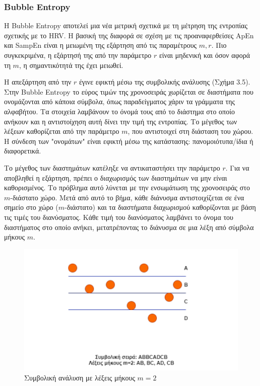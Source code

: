 \subsubsection{\en Bubble Entropy \gr}
Η \en Bubble Entropy \gr αποτελεί μια νέα μετρική σχετικά με τη μέτρηση της εντροπίας σχετικής με το \en HRV. \gr Η βασική της διαφορά σε σχέση με τις προαναφερθείσες \en ApEn \gr και \en SampEn \gr είναι η μειωμένη της εξάρτηση από τις παραμέτρους $m, r$. Πιο συγκεκριμένα, η εξάρτησή της από την παράμετρο $r$ είναι μηδενική και όσον αφορά τη $m$, η σημαντικότητά της έχει μειωθεί.
\par 
Η απεξάρτηση από την $r$ έγινε εφικτή μέσω της συμβολικής ανάλυσης (Σχήμα 3.5). Στην \en Bubble Entropy \gr το εύρος τιμών της χρονοσειράς χωρίζεται σε διαστήματα που ονομάζονται από κάποια σύμβολα, όπως παραδείγματος χάριν τα γράμματα της αλφαβήτου. Τα στοιχεία λαμβάνουν το όνομά τους από το διάστημα στο οποίο ανήκουν και η αντιστοίχηση αυτή δίνει την τιμή της εντροπίας. Το μέγεθος των λέξεων καθορίζεται από την παράμετρο $m$, που αντιστοιχεί στη διάσταση του χώρου. Η σύνδεση των "ονομάτων" είναι εφικτή μέσω της κατάστασης: πανομοιότυπα/ίδια ή διαφορετικά. 
\par
Το μέγεθος των διαστημάτων κατέληξε να αντικαταστήσει την παράμετρο $r$. Για να αποβληθεί η εξάρτηση, πρέπει ο διαχωρισμός των διαστημάτων να μην είναι καθορισμένος. Το πρόβλημα αυτό λύνεται με την ενσωμάτωση της χρονοσειράς στο $m$-διάστατο χώρο. Μετά από αυτό το βήμα, κάθε διάνυσμα αντιστοιχίζεται σε ένα σημείο στο χώρο ($m$-διάστατο) και τα διαστήματα διαχωρισμού καθορίζονται με βάση τις τιμές του διανύσματος. Κάθε τιμή του διανύσματος λαμβάνει το όνομα του διαστήματος στο οποίο ανήκει, μετατρέποντας το διάνυσμα σε μια λέξη από σύμβολα μήκους $m$.
\begin{figure}[h!]
	\centering
	\includegraphics[scale = 0.7]{Bubble.png}    
	\caption{\gr Συμβολική ανάλυση με λέξεις μήκους $m = 2$}
\end{figure}

